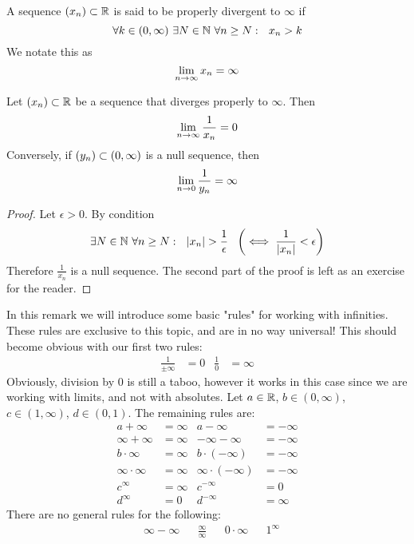 \documentclass[../../script.tex]{subfiles}
\begin{document}
\begin{defi}
A sequence $(x_n) \subset \mathbb{R}$ is said to be properly divergent to $\infty$ if
\[
	\forall k \in (0, \infty) ~\exists N \in \mathbb{N} ~\forall n \ge N: ~~x_n > k
\]
We notate this as
\[
	\lim_{n \rightarrow \infty} x_n = \infty
\]
\end{defi}

\begin{thm}
Let $(x_n) \subset \mathbb{R}$ be a sequence that diverges properly to $\infty$. Then
\[
	\lim_{n \rightarrow \infty} \frac{1}{x_n} = 0
\]
Conversely, if $(y_n) \subset (0, \infty)$ is a null sequence, then
\[
	\lim_{n \rightarrow 0} \frac{1}{y_n} = \infty
\]
\end{thm}
\begin{proof}
Let $\epsilon > 0$. By condition
\begin{equation}
	\exists N \in \mathbb{N} ~\forall n \ge N: ~~|x_n| > \frac{1}{\epsilon} ~~\left( \iff \frac{1}{|x_n|} < \epsilon \right)
\end{equation}
Therefore $\frac{1}{x_n}$ is a null sequence. The second part of the proof is left as an exercise for the reader.
\end{proof}

\begin{rem}
In this remark we will introduce some basic "rules" for working with infinities. These rules are exclusive to this topic, and are in no way universal! This should become obvious with our first two rules:
\begin{align*}
	\frac{1}{\pm\infty} &= 0 & \frac{1}{0} &= \infty
\end{align*}
Obviously, division by $0$ is still a taboo, however it works in this case since we are working with limits, and not with absolutes. Let $a \in \mathbb{R}$, $b \in (0, \infty)$, $c \in (1, \infty)$, $d \in (0, 1)$. The remaining rules are:
\begin{align*}
	a + \infty &= \infty	&	a - \infty &= -\infty \\
	\infty + \infty &= \infty	&	-\infty - \infty &= -\infty \\
	b \cdot \infty &= \infty	&	b \cdot (-\infty) &= -\infty \\
	\infty \cdot \infty &= \infty	&	\infty \cdot (-\infty) &= -\infty \\
	c^{\infty} &= \infty	&	c^{-\infty} &= 0 \\
	d^{\infty} &= 0		&	d^{-\infty} &= \infty
\end{align*}
There are no general rules for the following:
\begin{align*}
	&\infty - \infty & &\frac{\infty}{\infty} & &0 \cdot \infty & &1^{\infty}
\end{align*}
\end{rem}
\end{document}
